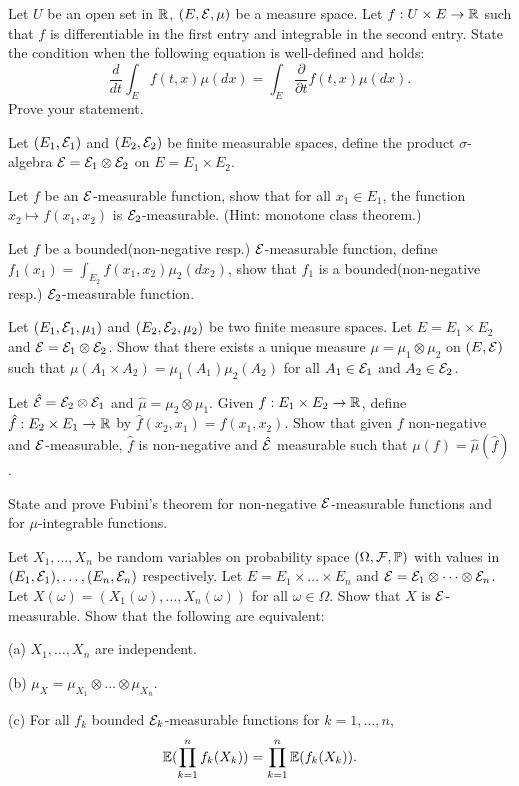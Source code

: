 \begin{question}{19}
Let $U$ be an open set in $\mathbb{R}$, $(E,\mathcal{E},\mu)$ be a measure space. Let $f : U \times E \rightarrow \mathbb{R}$ such that $f$ is differentiable in the first entry and integrable in the second entry. State the condition when the following equation is well-defined and holds:
    \[
    \frac{d}{dt}\int_E f(t,x) \mu(dx) = \int_E \frac{\partial}{\partial t} f(t,x) \mu(dx).
    \]
Prove your statement.
\end{question}

\begin{question}{20}
    Let $(E_1,\mathcal{E}_1)$ and $(E_2,\mathcal{E}_2)$ be finite measurable spaces, define the product $\sigma$-algebra $\mathcal{E} = \mathcal{E}_1 \otimes \mathcal{E}_2$ on $E = E_1 \times E_2$.

    Let $f$ be an $\mathcal{E}$-measurable function, show that for all $x_1 \in E_1$, the function $x_2 \mapsto f(x_1,x_2)$ is $\mathcal{E}_2$-measurable. (Hint: monotone class theorem.)

    Let $f$ be a bounded(non-negative resp.) $\mathcal{E}$-measurable function, define $f_1(x_1) = \int_{E_2} f(x_1,x_2) \mu_2(dx_2)$, show that $f_1$ is a bounded(non-negative resp.) $\mathcal{E}_2$-measurable function.
\end{question}

\begin{question}{21}
    Let $(E_1,\mathcal{E}_1,\mu_1)$ and $(E_2,\mathcal{E}_2,\mu_2)$ be two finite measure spaces. Let $E = E_1 \times E_2$ and $\mathcal{E} = \mathcal{E}_1 \otimes \mathcal{E}_2$. Show that there exists a unique measure $\mu = \mu_1 \otimes \mu_2$ on $(E,\mathcal{E})$ such that $\mu(A_1 \times A_2) = \mu_1(A_1)\mu_2(A_2)$ for all $A_1 \in \mathcal{E}_1$ and $A_2 \in \mathcal{E}_2$.

    Let $\hat {\mathcal{E}} = \mathcal{E}_2 \otimes \mathcal{E}_1$ and $\hat \mu = \mu_2 \otimes \mu_1$. Given $f: E_1 \times E_2 \rightarrow \mathbb{R}$, define $\hat f : E_2 \times E_1 \rightarrow \mathbb{R}$ by $\hat f (x_2,x_1) = f(x_1,x_2)$. Show that given $f$ non-negative and $\mathcal{E}$-measurable, $\hat f$ is non-negative and $\hat {\mathcal{E}}$ measurable such that $\mu(f) = \hat \mu(\hat f)$. 

    State and prove Fubini's theorem for non-negative $\mathcal{E}$-measurable functions and for $\mu$-integrable functions.

    Let $X_1, \dots, X_n$ be random variables on probability space $(\Omega, \mathcal{F}, \mathbb{P})$ with values in $(E_1,\mathcal{E}_1),\dots,(E_n,\mathcal{E}_n)$ respectively. Let $E = E_1 \times \dots \times E_n$ and $\mathcal{E} = \mathcal{E}_1 \otimes \dots \otimes \mathcal{E}_n$. Let $X(\omega) = (X_1(\omega),\dots,X_n(\omega))$ for all $\omega \in \Omega$. Show that $X$ is $\mathcal{E}$-measurable. Show that the following are equivalent:

    (a) $X_1,\dots,X_n$ are independent.

    (b) $\mu_X = \mu_{X_1} \otimes \dots \otimes \mu_{X_n}$.

    (c) For all $f_k$ bounded $\mathcal{E}_k$-measurable functions for $k = 1,\dots,n$, 
    \[
    \mathbb{E}(\prod_{k=1}^n f_k(X_k)) = \prod_{k=1}^n \mathbb{E}(f_k(X_k)).
    \]
\end{question}

